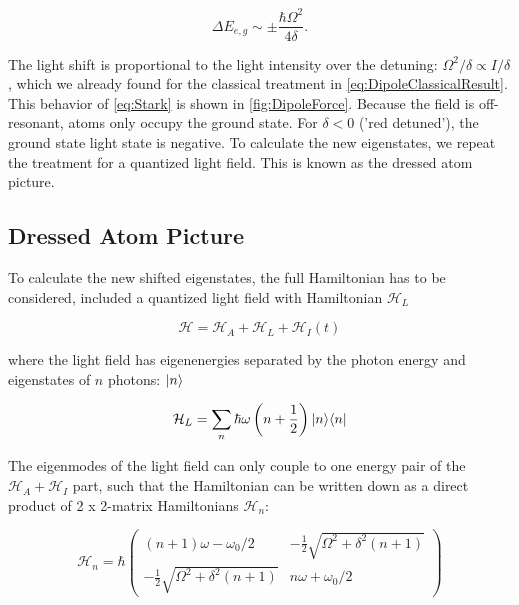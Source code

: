 \begin{equation}\label{eq:Stark}
	\Delta E_{e,g} \sim \pm \frac{\hbar \Omega^2}{4 \delta}.
\end{equation}

The light shift is proportional to the light intensity over the detuning: $\Omega^2 / \delta \propto I / \delta$, which we already found for the classical treatment in \cref{eq:DipoleClassicalResult}. This behavior of \cref{eq:Stark} is shown in \cref{fig:DipoleForce}. Because the field is off-resonant, atoms only occupy the ground state. For $\delta <0$ ('red detuned'), the ground state light state is negative. To calculate the new eigenstates, we repeat the treatment for a quantized light field. This is known as the dressed atom picture.

\subsection{Dressed Atom Picture}\label{sec:DressedApproach}

To calculate the new shifted eigenstates, the full Hamiltonian has to be considered, included a quantized light field with Hamiltonian $\mathcal{H}_L$ \cite{Dalibard1985}

\begin{equation}
	\mathcal{H} = \mathcal{H}_A + \mathcal{H}_L + \mathcal{H}_I(t)
\end{equation}

where the light field has eigenenergies separated by the photon energy and eigenstates of $n$ photons: $\lvert n\rangle$ \cite{Vredenbregt2020}

\begin{equation}\label{eq:RadiationModes}
	\mathcal{H}_L = \sum_n \hbar \omega \left(n+\frac{1}{2}\right) \lvert n\rangle\langle n\rvert
\end{equation}

The eigenmodes of the light field can only couple to one energy pair of the $\mathcal{H}_A + \mathcal{H}_I$ part, such that the Hamiltonian can be written down as a direct product of 2 x 2-matrix Hamiltonians \cite{Vredenbregt2020,Hussin2005} $\mathcal{H}_n$:

\begin{equation}\label{eq:CunningsHamiltonian}
    \mathcal{H}_n = \hbar 
    \begin{pmatrix}
        (n + 1)\omega -\omega_0 / 2                     & -\frac{1}{2}\sqrt{\Omega^2+\delta^2(n+1)} \\
        -\frac{1}{2}\sqrt{\Omega^2 + \delta^2(n+1)}  & n\omega + \omega_0/2
    \end{pmatrix}
\end{equation}

